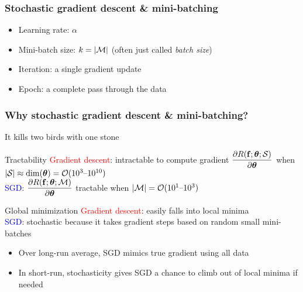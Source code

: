 \begin{frame}
    \frametitle{Stochastic gradient descent \& mini-batching}
    \begin{algorithmic}[1]
        \ENDFOR
    \end{algorithmic}
    \vspace{1ex}

    \begin{itemize}[<.->]
        \item \alert{Learning rate}: $\alpha$
        \item \alert{Mini-batch size}: $k = |\mathcal{M}|$ (often just called \emph{batch size})
        \item \alert{Iteration}: a single gradient update
        \item \alert{Epoch}: a complete pass through the data
    \end{itemize}
\end{frame}

\begin{frame}
    \frametitle{Why stochastic gradient descent \& mini-batching?}
    It kills two birds with one stone

    \begin{block}{Tractability}
        \textcolor{red}{Gradient descent}: intractable to compute gradient $\dfrac{\partial R(\mathbf{f}; \bm{\theta}; \mathcal{S})}{\partial \bm{\theta}}$ when $|\mathcal{S}| \approx \dim(\bm{\theta}) = \mathcal{O}(10^3 \text{--} 10^{10})$ \\[1ex]
        \textcolor{blue}{SGD}: $\dfrac{\partial R(\mathbf{f}; \bm{\theta}; \mathcal{M})}{\partial \bm{\theta}}$ tractable when $|\mathcal{M}| = \mathcal{O}(10^1 \text{--} 10^3)$
    \end{block}

    \begin{block}{Global minimization}
        \textcolor{red}{Gradient descent}: easily falls into local minima \\[1ex]
        \textcolor{blue}{SGD}: stochastic because it takes gradient steps based on random small mini-batches
        \begin{itemize}
            \item Over long-run average, SGD mimics true gradient using all data
            \item In short-run, stochasticity gives SGD a chance to climb out of local minima if needed
        \end{itemize}
    \end{block}
\end{frame}


